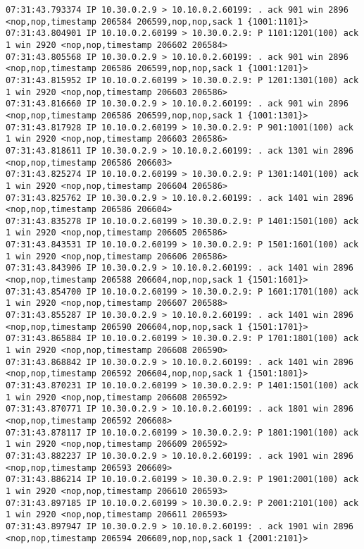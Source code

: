 \documentclass[a4paper,12pt]{article}
\begin{document}
\begin{Verbatim}
07:31:43.793374 IP 10.30.0.2.9 > 10.10.0.2.60199: . ack 901 win 2896 <nop,nop,timestamp 206584 206599,nop,nop,sack 1 {1001:1101}>
07:31:43.804901 IP 10.10.0.2.60199 > 10.30.0.2.9: P 1101:1201(100) ack 1 win 2920 <nop,nop,timestamp 206602 206584>
07:31:43.805568 IP 10.30.0.2.9 > 10.10.0.2.60199: . ack 901 win 2896 <nop,nop,timestamp 206586 206599,nop,nop,sack 1 {1001:1201}>
07:31:43.815952 IP 10.10.0.2.60199 > 10.30.0.2.9: P 1201:1301(100) ack 1 win 2920 <nop,nop,timestamp 206603 206586>
07:31:43.816660 IP 10.30.0.2.9 > 10.10.0.2.60199: . ack 901 win 2896 <nop,nop,timestamp 206586 206599,nop,nop,sack 1 {1001:1301}>
07:31:43.817928 IP 10.10.0.2.60199 > 10.30.0.2.9: P 901:1001(100) ack 1 win 2920 <nop,nop,timestamp 206603 206586>
07:31:43.818611 IP 10.30.0.2.9 > 10.10.0.2.60199: . ack 1301 win 2896 <nop,nop,timestamp 206586 206603>
07:31:43.825274 IP 10.10.0.2.60199 > 10.30.0.2.9: P 1301:1401(100) ack 1 win 2920 <nop,nop,timestamp 206604 206586>
07:31:43.825762 IP 10.30.0.2.9 > 10.10.0.2.60199: . ack 1401 win 2896 <nop,nop,timestamp 206586 206604>
07:31:43.835278 IP 10.10.0.2.60199 > 10.30.0.2.9: P 1401:1501(100) ack 1 win 2920 <nop,nop,timestamp 206605 206586>
07:31:43.843531 IP 10.10.0.2.60199 > 10.30.0.2.9: P 1501:1601(100) ack 1 win 2920 <nop,nop,timestamp 206606 206586>
07:31:43.843906 IP 10.30.0.2.9 > 10.10.0.2.60199: . ack 1401 win 2896 <nop,nop,timestamp 206588 206604,nop,nop,sack 1 {1501:1601}>
07:31:43.854700 IP 10.10.0.2.60199 > 10.30.0.2.9: P 1601:1701(100) ack 1 win 2920 <nop,nop,timestamp 206607 206588>
07:31:43.855287 IP 10.30.0.2.9 > 10.10.0.2.60199: . ack 1401 win 2896 <nop,nop,timestamp 206590 206604,nop,nop,sack 1 {1501:1701}>
07:31:43.865884 IP 10.10.0.2.60199 > 10.30.0.2.9: P 1701:1801(100) ack 1 win 2920 <nop,nop,timestamp 206608 206590>
07:31:43.868842 IP 10.30.0.2.9 > 10.10.0.2.60199: . ack 1401 win 2896 <nop,nop,timestamp 206592 206604,nop,nop,sack 1 {1501:1801}>
07:31:43.870231 IP 10.10.0.2.60199 > 10.30.0.2.9: P 1401:1501(100) ack 1 win 2920 <nop,nop,timestamp 206608 206592>
07:31:43.870771 IP 10.30.0.2.9 > 10.10.0.2.60199: . ack 1801 win 2896 <nop,nop,timestamp 206592 206608>
07:31:43.878117 IP 10.10.0.2.60199 > 10.30.0.2.9: P 1801:1901(100) ack 1 win 2920 <nop,nop,timestamp 206609 206592>
07:31:43.882237 IP 10.30.0.2.9 > 10.10.0.2.60199: . ack 1901 win 2896 <nop,nop,timestamp 206593 206609>
07:31:43.886214 IP 10.10.0.2.60199 > 10.30.0.2.9: P 1901:2001(100) ack 1 win 2920 <nop,nop,timestamp 206610 206593>
07:31:43.897185 IP 10.10.0.2.60199 > 10.30.0.2.9: P 2001:2101(100) ack 1 win 2920 <nop,nop,timestamp 206611 206593>
07:31:43.897947 IP 10.30.0.2.9 > 10.10.0.2.60199: . ack 1901 win 2896 <nop,nop,timestamp 206594 206609,nop,nop,sack 1 {2001:2101}>

\end{Verbatim}
\end{document}
